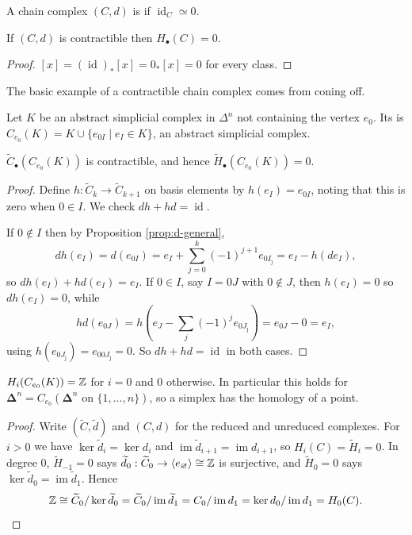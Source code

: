 \documentclass[a4paper]{scrartcl}
\newcommand{\id}{\operatorname{id}}
\newcommand{\genby}[1]{\langle #1 \rangle}
\newcommand{\bDelta}{\boldsymbol{\Delta}}
\begin{document}
\begin{definition}
	A chain complex $(C,d)$ is  if $\id_C \simeq 0$.
\end{definition}

\begin{lemma} \label{lem:contractible-chain}
	If $(C,d)$ is contractible then $H_\bullet(C) = 0$.
\end{lemma}
\begin{proof}
	$[x] = (\id)_*[x] = 0_*[x] = 0$ for every class.
\end{proof}

The basic example of a contractible chain complex comes from coning off.

\begin{definition}
	Let $K$ be an abstract simplicial complex in $\Delta^n$ not containing the vertex $e_0$. Its  is $C_{e_0}(K) = K \cup \{e_{0I} \mid e_I \in K\}$, an abstract simplicial complex.
\end{definition}

\begin{proposition} \label{prop:cone-contractible}
	$\widetilde C_\bullet(C_{e_0}(K))$ is contractible, and hence $\widetilde H_\bullet(C_{e_0}(K)) = 0$.
\end{proposition}
\begin{proof}
	Define $h: \widetilde C_k \to \widetilde C_{k+1}$ on basis elements by $h(e_I) = e_{0I}$, noting that this is zero when $0 \in I$. We check $dh + hd = \id$.

	If $0 \notin I$ then by Proposition \ref{prop:d-general},
	$$
	dh(e_I) = d(e_{0I}) = e_I + \sum_{j=0}^{k}(-1)^{j+1}e_{0I_{\hat\jmath}} = e_I - h(d e_I),
	$$
	so $dh(e_I)+hd(e_I) = e_I$. If $0 \in I$, say $I = 0J$ with $0 \notin J$, then $h(e_I) = 0$ so $dh(e_I) = 0$, while
	$$
	hd(e_{0J}) = h\left(e_J - \sum_j (-1)^{j}e_{0J_{\hat\jmath}}\right) = e_{0J} - 0 = e_I,
	$$
	using $h(e_{0J_{\hat\jmath}}) = e_{00J_{\hat\jmath}} = 0$. So $dh+hd = \id$ in both cases.
\end{proof}

\begin{corollary} \label{cor:cone-homology}
	$H_i(C_{e_0}(K)) = \mathbb{Z}$ for $i=0$ and $0$ otherwise. In particular this holds for $\bDelta^n = C_{e_0}(\bDelta^{n}\text{ on } \{1,\dots,n\})$, so a simplex has the homology of a point.
\end{corollary}
\begin{proof}
	Write $(\widetilde C, \widetilde d)$ and $(C,d)$ for the reduced and unreduced complexes. For $i > 0$ we have $\ker \widetilde d_i = \ker d_i$ and $\operatorname{im}\widetilde d_{i+1} = \operatorname{im}d_{i+1}$, so $H_i(C) = \widetilde H_i = 0$. In degree $0$, $\widetilde H_{-1} = 0$ says $\widetilde d_0: \widetilde C_0 \to \genby{e_\varnothing}\cong\Z$ is surjective, and $\widetilde H_0 = 0$ says $\ker\widetilde d_0 = \operatorname{im}\widetilde d_1$. Hence
	$$
	\mathbb{Z} \cong \widetilde C_0/\ker\widetilde d_0 = \widetilde C_0 /\operatorname{im}\widetilde d_1 = C_0/\operatorname{im}d_1 = \ker d_0/\operatorname{im}d_1 = H_0(C). \qedhere
	$$
\end{proof}
\end{document}
